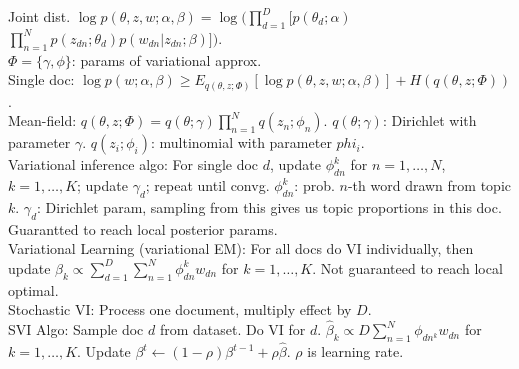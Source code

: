 Joint dist. $\log p(\theta, z, w; \alpha, \beta) = \log ( \prod_{d=1}^D [ p(\theta_d; \alpha)$\\
$\prod_{n=1}^N p(z_{dn}; \theta_d) p(w_{dn} | z_{dn}; \beta) ] )$.\\
$\Phi = \{\gamma, \phi\}$: params of variational approx.\\
Single doc: $\log p(w; \alpha, \beta) \geq E_{q(\theta, z; \Phi)}[\log p(\theta, z, w; \alpha, \beta)] + H(q(\theta, z; \Phi))$.\\
Mean-field: $q(\theta, z; \Phi) = q(\theta; \gamma)\prod_{n=1}^N q(z_n; \phi_n)$. $q(\theta; \gamma)$: Dirichlet with parameter $\gamma$. $q(z_i; \phi_i)$: multinomial with parameter $phi_i$.\\
Variational inference algo: For single doc $d$, update $\phi_{dn}^k$ for $n=1, \dots, N$, $k=1, \dots, K$; update $\gamma_d$; repeat until convg. $\phi_{dn}^k$: prob. $n$-th word drawn from topic $k$. $\gamma_d$: Dirichlet param, sampling from this gives us topic proportions in this doc. Guarantted to reach local posterior params.\\
Variational Learning (variational EM): For all docs do VI individually, then update $\beta_k \propto \sum_{d=1}^D \sum_{n=1}^N \phi_{dn}^k w_{dn}$ for $k=1, \dots, K$. Not guaranteed to reach local optimal.\\
Stochastic VI: Process one document, multiply effect by $D$.\\
SVI Algo: Sample doc $d$ from dataset. Do VI for $d$. $\hat{\beta}_k \propto D \sum_{n=1}^N \phi_{dn^k} w_{dn}$ for $k=1, \dots, K$. Update $\beta^t \leftarrow (1-\rho)\beta^{t-1} + \rho \hat{\beta}$. $\rho$ is learning rate.